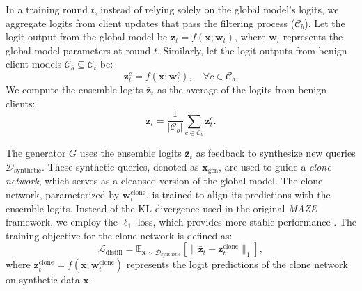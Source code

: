 In a training round $t$, instead of relying solely on the global model’s logits, we aggregate logits from client updates that pass the filtering process (\ie $\mathcal{C}_b$). Let the logit output from the global model be \( \mathbf{z}_t = f(\mathbf{x}; \mathbf{w}_t) \), where \( \mathbf{w}_t \) represents the global model parameters at round \( t \). Similarly, let the logit outputs from benign client models \( \mathcal{C}_b \subseteq \mathcal{C}_t \) be:
\begin{equation}
    \mathbf{z}_{t}^c = f(\mathbf{x}; \mathbf{w}_t^c), \quad \forall c \in \mathcal{C}_b.
\end{equation}
We compute the ensemble logits \( \mathbf{\bar{z}}_t \) as the average of the logits from benign clients:
\begin{equation}
    \mathbf{\bar{z}}_t = \frac{1}{|\mathcal{C}_b|} \sum_{c \in \mathcal{C}_b} \mathbf{z}_{t}^c.
\end{equation}

The generator \( G \) uses the ensemble logits \( \mathbf{\bar{z}}_t \) as feedback to synthesize new queries \( \mathcal{D}_{\text{synthetic}} \). These synthetic queries, denoted as \( \mathbf{x}_{\text{gen}} \), are used to guide a \textit{clone network}, which serves as a cleansed version of the global model. The clone network, parameterized by \( \mathbf{w}^{\text{clone}}_t \), is trained to align its predictions with the ensemble logits. Instead of the KL divergence used in the original \textit{MAZE} framework, we employ the \(\ell_1\)-loss, which provides more stable performance \citep{truong2021data}. The training objective for the clone network is defined as:
\begin{equation}
    \mathcal{L}_{\text{distill}} = \mathbb{E}_{\mathbf{x} \sim \mathcal{D}_{\text{synthetic}}} \left[ \| \mathbf{\bar{z}}_t - \mathbf{z}_t^{\text{clone}} \|_1 \right],
\end{equation}
where \( \mathbf{z}_t^{\text{clone}} = f(\mathbf{x}; \mathbf{w}^{\text{clone}}_t) \) represents the logit predictions of the clone network on synthetic data \( \mathbf{x} \).

